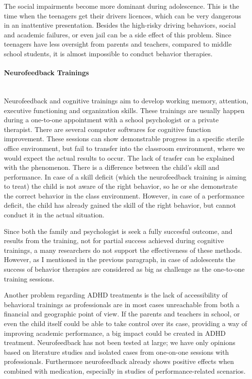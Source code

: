 \documentclass[letterpaper,10pt]{article}
\begin{document}
The social impairments become more  dominant during  adolescence. This is the time when the teenagers get  their drivers licences, which can be very dangerous in an inattentive presentation. Besides the high-risky driving behaviors, social and academic failures, or even jail can be a side effect of this problem. Since teenagers have less oversight from parents and teachers, compared to middle school students, it is almost impossible to conduct behavior therapies. 

\paragraph{Neurofeedback Trainings} \\

Neurofeedback and cognitive trainings aim to develop working memory, attention, executive functioning and organization skills. \cite{pelham_fabiano_2008} These trainings are usually happen during a one-to-one appointment with a school psychologist or a private therapist. There are several computer softwares for cognitive function improvement. These sessions can show demonstrable progress in a specific sterile office environment, but fail to transfer into the classroom environment, where we would expect the actual results to occur.
The lack of trasfer can be explained with the phenomenon. There is a difference between the child's skill and performance. In case of a skill deficit (which the neurofeedback training is aiming to treat) the child is not aware of the right behavior, so he or she demonstrate the correct behavior in the class environment. However, in case of a performance deficit, the child has already gained the skill of the right behavior, but cannot conduct it in the actual situation. 

Since both the family and psychologist is seek a fully succesful outcome, and results from the training, not for partial success achieved during cognitive trainings, a many researchers do not support the effectiveness of these methods. However, as I mentioned in the previous paragraph, in case of adolescents the success of behavior therapies are considered as big as challenge  as the one-to-one training sessions.

Another problem regarding ADHD treatments is the lack of accessibility of behavioral trainings as professionals are in most cases unreachable from both a financial and geographic point of view. If the parents and teachers in school, or even the child itself could be able to take control over its case, providing a way of improving academic performance, a big impact could be created in ADHD treatment. Neurofeedback has not been tested at large; we have only opinions based on literature studies and isolated cases from one-on-one sessions with professionals. Furthermore neurofeedback already shows positive effects when combined with medication, especially in studies of performance-related scenarios.
\end{document}
